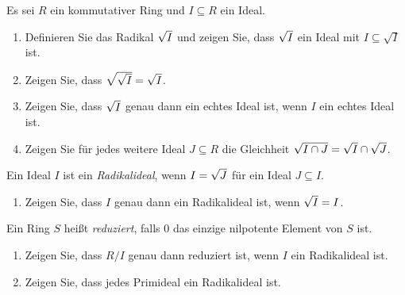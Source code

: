 \begin{question}[subtitle = Radikale]
  \label{question: radical ideals}
  Es sei $R$ ein kommutativer Ring und $I \subseteq R$ ein Ideal.
  \begin{enumerate}
    \item
      Definieren Sie das Radikal $\sqrt{I}$ und zeigen Sie, dass $\sqrt{I}$ ein Ideal mit $I \subseteq \sqrt{I}$ ist.
    \item
      Zeigen Sie, dass $\sqrt{\sqrt{I}} = \sqrt{I}$.
    \item
      Zeigen Sie, dass $\sqrt{I}$ genau dann ein echtes Ideal ist, wenn $I$ ein echtes Ideal ist.
    \item
      Zeigen Sie für jedes weitere Ideal $J \subseteq R$ die Gleichheit $\sqrt{I \cap J} = \sqrt{I} \cap \sqrt{J}$.
  \end{enumerate}
  Ein Ideal $I$ ist ein \emph{Radikalideal}, wenn $I = \sqrt{J}$ für ein Ideal $J \subseteq I$.
  \begin{enumerate}[resume]
    \item
      Zeigen Sie, dass $I$ genau dann ein Radikalideal ist, wenn $\sqrt{I} = I$.
  \end{enumerate}
  Ein Ring $S$ heißt \emph{reduziert}, falls $0$ das einzige nilpotente Element von $S$ ist.
  \begin{enumerate}[resume]
    \item
      Zeigen Sie, dass $R/I$ genau dann reduziert ist, wenn $I$ ein Radikalideal ist.
    \item
      Zeigen Sie, dass jedes Primideal ein Radikalideal ist.
  \end{enumerate}
\end{question}


